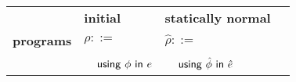 \documentclass[10pt,preprint]{sigplanconf}
\begin{document}
{%
\begin{figure*}[t]
\small
\begin{tabular}{r l l l}
 & \textbf{initial} & \textbf{statically normal}\\
\textbf{programs} & $\rho ::=$ & $\hat\rho ::=$\\
 & ~~${\sf using}~{\phi}~{\sf in}~e$ & ~~${\sf using}~{\hat\phi}~{\sf in}~\hat e$\\

\end{tabular}
\end{figure*}}
\end{document}
